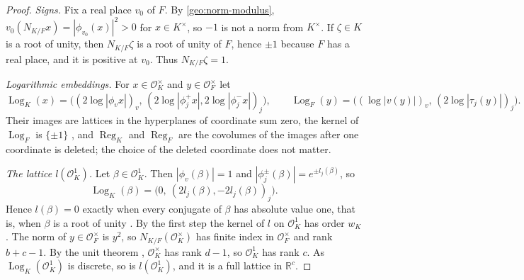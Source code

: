 \documentclass[11pt]{amsart}
\numberwithin{equation}{section}
\theoremstyle{definition}
\theoremstyle{remark}
\newcommand{\R}{\mathbb R}
\begin{document}
\begin{proof}
\emph{Signs.} Fix a real place $v_0$ of $F$. By
\eqref{geo:norm-modulus}, $v_0(N_{K/F}x)=|\phi_{v_0}(x)|^2>0$ for
$x\in K^\times$, so $-1$ is not a norm from $K^\times$. If $\zeta\in K$
is a root of unity, then $N_{K/F}\zeta$ is a root of unity of $F$,
hence $\pm1$ because $F$ has a real place, and it is positive at $v_0$.
Thus $N_{K/F}\zeta=1$.

\emph{Logarithmic embeddings.} For $x\in\mathcal O_K^\times$ and
$y\in\mathcal O_F^\times$ let
\[
 \operatorname{Log}_K(x)=\bigl((2\log|\phi_vx|)_v,\,(2\log|\phi_j^+x|,
 2\log|\phi_j^-x|)_j\bigr),\qquad
 \operatorname{Log}_F(y)=\bigl((\log|v(y)|)_v,\,(2\log|\tau_j(y)|)_j\bigr).
\]
Their images are lattices in the hyperplanes of coordinate sum zero,
the kernel of $\operatorname{Log}_F$ is $\{\pm1\}$
\cite[Proposition~5.8]{MilneANT}, and $\operatorname{Reg}_K$ and
$\operatorname{Reg}_F$ are the covolumes of the images after one
coordinate is deleted; the choice of the deleted coordinate does not
matter.

\emph{The lattice $l(\mathcal O_K^1)$.} Let $\beta\in\mathcal O_K^1$. Then
$|\phi_v(\beta)|=1$ and $|\phi_j^\pm(\beta)|=e^{\pm l_j(\beta)}$, so
\[
 \operatorname{Log}_K(\beta)=\bigl(0,\ (2l_j(\beta),-2l_j(\beta))_j\bigr).
\]
Hence $l(\beta)=0$ exactly when every conjugate of $\beta$ has absolute
value one, that is, when $\beta$ is a root of unity
\cite[Corollary~5.6]{MilneANT}. By the first step the kernel of $l$ on
$\mathcal O_K^1$ has order $w_K$. The norm of $y\in\mathcal O_F^\times$
is $y^2$, so $N_{K/F}(\mathcal O_K^\times)$ has finite index in
$\mathcal O_F^\times$ and rank $b+c-1$. By the unit theorem
\cite[Theorem~5.1]{MilneANT}, $\mathcal O_K^\times$ has rank $d-1$, so
$\mathcal O_K^1$ has rank $c$. As $\operatorname{Log}_K(\mathcal O_K^1)$
is discrete, so is $l(\mathcal O_K^1)$, and it is a full lattice in
$\R^c$.


\end{proof}
\end{document}
